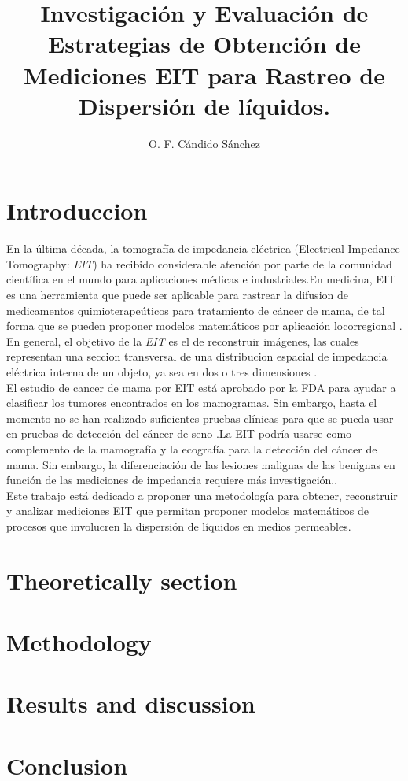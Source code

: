 \documentclass{IEEEtran}
\title{Investigación y Evaluación de Estrategias de Obtención de Mediciones EIT para Rastreo de Dispersión de líquidos. }
\author[1]{O. F. Cándido Sánchez}
\affil[1]{Departamento de Ingeniería Electrónica, Instituto Tecnológico de Morelia}
\begin{document}
  \maketitle
  \begin{abstract}
  \end{abstract}

  \begin{IEEEkeywords}
  \end{IEEEkeywords}

  \section{Introduccion}
En la última década, la tomografía de impedancia eléctrica (Electrical Impedance Tomography: \textit{EIT}) ha recibido considerable atención por parte de la comunidad científica en el mundo para aplicaciones médicas e industriales.En medicina, EIT es una herramienta que puede ser aplicable para rastrear la difusion de medicamentos quimioterapeúticos para tratamiento de cáncer de mama, de tal forma que se pueden proponer modelos matemáticos por aplicación locorregional \cite{Gnecchi2018}.\\
En general, el objetivo de la \textit{EIT} es el de reconstruir imágenes, las cuales representan una seccion transversal de una distribucion espacial de impedancia eléctrica interna de un objeto, ya sea en dos o tres dimensiones \cite{Gnecchi2012}.\\

El estudio de cancer de mama por EIT está aprobado por la FDA para ayudar a clasificar los tumores encontrados en los mamogramas. Sin embargo, hasta el momento no se han realizado suficientes pruebas clínicas para que se pueda usar en pruebas de detección del cáncer de seno \cite{Cancer.org}.La EIT podría usarse como complemento de la mamografía y la ecografía para la detección del cáncer de mama. Sin embargo, la diferenciación de las lesiones malignas de las benignas en función de las mediciones de impedancia requiere más investigación.\cite{Zou2003}.\\

Este trabajo está dedicado a proponer una metodología para obtener, reconstruir y analizar mediciones EIT que permitan proponer modelos matemáticos de procesos que involucren la dispersión de líquidos en medios permeables.\\


  \section{Theoretically section}
  \section{Methodology}
  \section{Results and discussion}
  \section{Conclusion}


\end{document}
